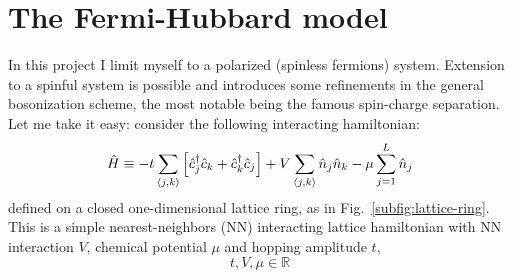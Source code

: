 \clearpage
\section{The Fermi-Hubbard model}

In this project I limit myself to a polarized (spinless fermions) system. Extension to a spinful system is possible and introduces some refinements in the general bosonization scheme, the most notable being the famous spin-charge separation. Let me take it easy: consider the following interacting hamiltonian:
\begin{equation}\label{eq:spinless-hamiltonian-pbc}
	\hat H \equiv -t \sum_{\ev{j,k}} \left[
		\hat c_j^\dagger \hat c_k + \hat c_k^\dagger \hat c_j 
	\right] + V \sum_{\ev{j,k}} \hat n_j \hat n_k - \mu \sum_{j=1}^L \hat n_j
\end{equation}
defined on a closed one-dimensional lattice ring, as in Fig.~\ref{subfig:lattice-ring}.
This is a simple nearest-neighbors (NN) interacting lattice hamiltonian with NN interaction $V$, chemical potential $\mu$ and hopping amplitude $t$,
\[
	t, V, \mu \in \mathbb{R}
\]

